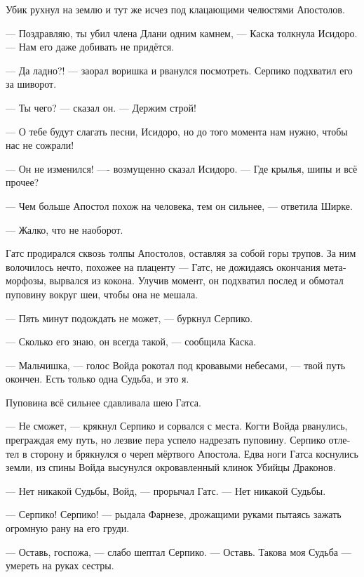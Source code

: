 \documentclass[a4paper,12pt,fleqn]{book}\usepackage{polyglossia}\setdefaultlanguage[babelshorthands=true]{russian}\setotherlanguage{english}\defaultfontfeatures{Ligatures=TeX,Mapping=tex-text}\usepackage{xcolor}\newcommand{\ml}[3]{#2}
\newcommand{\textspace}{\vspace{1em}{\centering\Large\bfseries<...>\par}\vspace{1em}}
\begin{document}
\textspace

Убик рухнул на землю и тут же исчез под клацающими челюстями Апостолов.

--- Поздравляю, ты убил члена Длани одним камнем, --- Каска толкнула Исидоро.
--- Нам его даже добивать не придётся.

--- Да ладно?! --- заорал воришка и рванулся посмотреть.
Серпико подхватил его за шиворот.

--- Ты чего? --- сказал он.
--- Держим строй!

--- О тебе будут слагать песни, Исидоро, но до того момента нам нужно, чтобы нас не сожрали!

\textspace

--- Он не изменился! ---- возмущенно сказал Исидоро.
--- Где крылья, шипы и всё прочее?

--- Чем больше Апостол похож на человека, тем он сильнее, --- ответила Ширке.

--- Жалко, что не наоборот.

\textspace

Гатс продирался сквозь толпы Апостолов, оставляя за собой горы трупов.
За ним волочилось нечто, похожее на плаценту --- Гатс, не дожидаясь окончания метаморфозы, вырвался из кокона.
Улучив момент, он подхватил послед и обмотал пуповину вокруг шеи, чтобы она не мешала.

--- Пять минут подождать не может, --- буркнул Серпико.

--- Сколько его знаю, он всегда такой, --- сообщила Каска. 

\textspace

--- Мальчишка, --- голос Войда рокотал под кровавыми небесами, --- твой путь окончен.
Есть только одна Судьба, и это я.

Пуповина всё сильнее сдавливала шею Гатса.

--- Не сможет, --- крякнул Серпико и сорвался с места.
Когти Войда рванулись, преграждая ему путь, но лезвие пера успело надрезать пуповину.
Серпико отлетел в сторону и брякнулся о череп мёртвого Апостола.
Едва ноги Гатса коснулись земли, из спины Войда высунулся окровавленный клинок Убийцы Драконов.

--- Нет никакой Судьбы, Войд, --- прорычал Гатс.
--- Нет никакой Судьбы.

--- Серпико!
Серпико! --- рыдала Фарнезе, дрожащими руками пытаясь зажать огромную рану на его груди.

--- Оставь, госпожа, --- слабо шептал Серпико.
--- Оставь.
Такова моя Судьба --- умереть на руках сестры.
\end{document}
